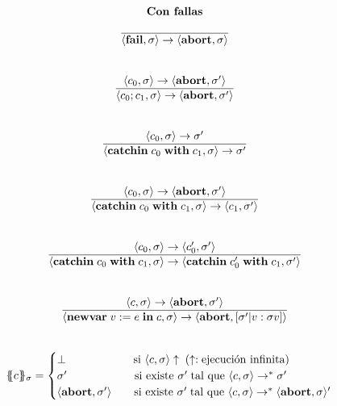     \[\begin{array}{cll}
      \textbf{Con fallas} \\ \\
      \overline{\lang{\fail, \sigma} \rightarrow \lang{\abort, \sigma}} \\ \\ \\

      \lang{c_0, \sigma} \rightarrow \lang{\abort, \sigma'} \\
      \overline{\lang{c_0;c_1, \sigma} \rightarrow \lang{\abort, \sigma'}} \\ \\ \\

      \lang{c_0, \sigma} \rightarrow \sigma' \\
      \overline{\lang{\catch{c_0}{c_1}, \sigma} \rightarrow \sigma'} \\ \\ \\
      \lang{c_0, \sigma} \rightarrow \lang{\abort, \sigma'} \\
      \overline{\lang{\catch{c_0}{c_1}, \sigma} \rightarrow \lang{c_1, \sigma'}} \\ \\ \\
      \lang{c_0, \sigma} \rightarrow \lang{c'_0, \sigma'} \\
      \overline{\lang{\catch{c_0}{c_1}, \sigma} \rightarrow \lang{\catch{c'_0}{c_1}, \sigma'}} \\ \\ \\

      \lang{c, \sigma} \rightarrow \lang{\abort, \sigma'} \\
      \overline{\lang{\newvar{v := e}{c}, \sigma} \rightarrow \lang{\abort, [\sigma' | v : \sigma v]}} \\ \\ \\

      \{\!\!\{c\}\!\!\}_{\sigma} = \begin{cases}
                                    \bot \qquad\qquad\qquad  \text{si } \lang{c, \sigma} \uparrow \; (\uparrow: \text{ejecución infinita}) \\
                                    \sigma' \qquad\qquad\qquad \text{si existe } \sigma' \; \text{tal que } \lang{c, \sigma} \rightarrow^{\ast} \sigma' \\
                                    \lang{\abort, \sigma'} \qquad \text{si existe } \sigma' \; \text{tal que } \lang{c, \sigma} \rightarrow^{\ast} \lang{\abort, \sigma}'
                                    \end{cases}
    \end{array}\]

